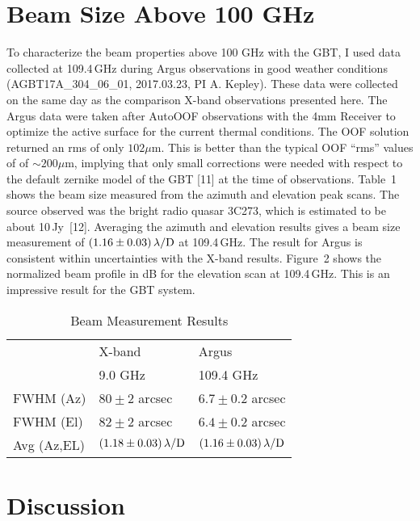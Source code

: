 \documentclass[12pt]{article}
\begin{document}
\section{Beam Size Above 100 GHz}

To characterize the beam properties above 100 GHz with the GBT, I used
data collected at 109.4\,GHz during Argus observations in good weather
conditions (AGBT17A\_304\_06\_01, 2017.03.23, PI A. Kepley).  These
data were collected on the same day as the comparison X-band
observations presented here.  The Argus data were taken after AutoOOF
observations with the 4mm Receiver to optimize the active surface for
the current thermal conditions.  The OOF solution returned an rms of
only $102\mu$m.  This is better than the typical OOF ``rms'' values of
of $\sim 200\mu$m, implying that only small corrections were needed
with respect to the default zernike model of the GBT [11] at the time
of observations.  Table~1 shows the beam size measured from the
azimuth and elevation peak scans. The source observed was the bright
radio quasar 3C273, which is estimated to be about 10\,Jy~[12].
Averaging the azimuth and elevation results gives a beam size
measurement of $(1.16\pm0.03)\,\lambda/{\rm D}$ at 109.4\,GHz.  The
result for Argus is consistent within uncertainties with the X-band
results.  Figure~2 shows the normalized beam profile in dB for the
elevation scan at 109.4\,GHz.  This is an impressive result for the
GBT system.


%
\begin{table}
\centering
  \caption{Beam Measurement Results}
  \begin{tabular}{lll}
    \hline \hline
 & X-band & Argus \\ 
 & 9.0 GHz& 109.4 GHz\\
\hline
FWHM (Az) & $80\pm2$ arcsec & $6.7\pm0.2$ arcsec\\
FWHM (El) & $82\pm2$ arcsec & $6.4\pm0.2$ arcsec\\
Avg (Az,EL)&$(1.18\pm0.03)\,\lambda/{\rm D}$
&$(1.16\pm0.03)\,\lambda/{\rm D}$\\
\hline
 \end{tabular}
\end{table}

\section{Discussion}
\end{document}
